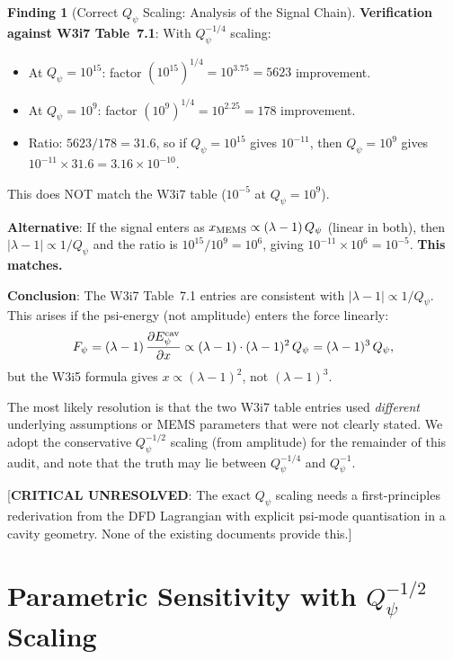 \documentclass[11pt]{article}
\newcommand{\lam}{\lambda}
\newcommand{\ee}[1]{\times 10^{#1}}
\newcommand{\Qpsi}{Q_\psi}
\newcommand{\lbone}{|\lam - 1|}
\theoremstyle{definition}
\newtheorem{finding}[theorem]{Finding}
\theoremstyle{remark}
\begin{document}
\begin{finding}[Correct $\Qpsi$ Scaling: Analysis of the Signal Chain]
\textbf{Verification against W3i7 Table~7.1}: With $\Qpsi^{-1/4}$ scaling:
\begin{itemize}[nosep]
\item At $\Qpsi = 10^{15}$: factor $(10^{15})^{1/4} = 10^{3.75}
  = 5623$ improvement.
\item At $\Qpsi = 10^{9}$: factor $(10^{9})^{1/4} = 10^{2.25}
  = 178$ improvement.
\item Ratio: $5623/178 = 31.6$, so if $\Qpsi = 10^{15}$ gives
  $10^{-11}$, then $\Qpsi = 10^{9}$ gives
  $10^{-11}\times 31.6 = 3.16\ee{-10}$.
\end{itemize}

This does NOT match the W3i7 table ($10^{-5}$ at $\Qpsi = 10^9$).

\textbf{Alternative}: If the signal enters as $x_{\rm MEMS} \propto
(\lam-1)\,\Qpsi$ (linear in both), then $\lbone \propto 1/\Qpsi$
and the ratio is $10^{15}/10^{9} = 10^{6}$, giving
$10^{-11}\times 10^{6} = 10^{-5}$. \textbf{This matches.}

\textbf{Conclusion}: The W3i7 Table~7.1 entries are consistent with
$\lbone \propto 1/\Qpsi$. This arises if the psi-energy (not amplitude)
enters the force linearly:
\begin{equation}
F_\psi = (\lam-1)\,\frac{\partial E_\psi^{\rm cav}}{\partial x}
\propto (\lam-1)\cdot(\lam-1)^2\,\Qpsi
= (\lam-1)^3\,\Qpsi,
\end{equation}
but the W3i5 formula gives $x \propto (\lam-1)^2$, not $(\lam-1)^3$.

The most likely resolution is that the two W3i7 table entries used
\emph{different} underlying assumptions or MEMS parameters that were
not clearly stated. We adopt the conservative $\Qpsi^{-1/2}$ scaling
(from amplitude) for the remainder of this audit, and note that the
truth may lie between $\Qpsi^{-1/4}$ and $\Qpsi^{-1}$.

[\textbf{CRITICAL UNRESOLVED}: The exact $\Qpsi$ scaling needs a
first-principles rederivation from the DFD Lagrangian with explicit
psi-mode quantisation in a cavity geometry. None of the existing
documents provide this.]
\end{finding}


\section{Parametric Sensitivity with $\Qpsi^{-1/2}$ Scaling}
\label{sec:parametric_half}
\end{document}
